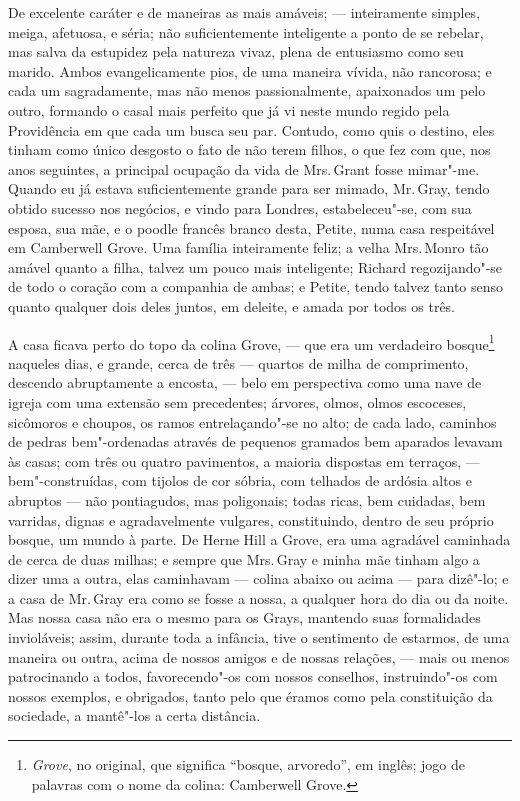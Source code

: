 De excelente caráter e de maneiras as mais amáveis; --- inteiramente
simples, meiga, afetuosa, e séria; não suficientemente inteligente a
ponto de se rebelar, mas salva da estupidez pela natureza vivaz, plena
de entusiasmo como seu marido. Ambos evangelicamente pios, de uma
maneira vívida, não rancorosa; e cada um sagradamente, mas não menos
passionalmente, apaixonados um pelo outro, formando o casal mais
perfeito que já vi neste mundo regido pela Providência em que cada um
busca seu par. Contudo, como quis o destino, eles tinham como único
desgosto o fato de não terem filhos, o que fez com que, nos anos
seguintes, a principal ocupação da vida de Mrs.\,Grant fosse
mimar"-me. Quando eu já estava suficientemente grande para ser
mimado, Mr.\,Gray, tendo obtido sucesso nos negócios, e vindo para
Londres, estabeleceu"-se, com sua esposa, sua mãe, e o poodle francês
branco desta, Petite, numa casa respeitável em Camberwell Grove. Uma
família inteiramente feliz; a velha Mrs.\,Monro tão amável quanto a filha,
talvez um pouco mais inteligente; Richard regozijando"-se de todo o
coração com a companhia de ambas; e Petite, tendo talvez tanto senso
quanto qualquer dois deles juntos, em deleite, e amada por todos os
três.

A casa ficava perto do topo da colina Grove, --- que era um
verdadeiro bosque\footnote{\textit{Grove}, no original, que significa
  ``bosque, arvoredo'', em inglês; jogo de palavras com o nome da
  colina: Camberwell Grove.} naqueles dias, e grande,
cerca de três --- quartos de milha de comprimento, descendo abruptamente
a encosta, --- belo em perspectiva como uma nave de igreja com uma
extensão sem precedentes; árvores, olmos, olmos escoceses, sicômoros e
choupos, os ramos entrelaçando"-se no alto; de cada lado, caminhos de
pedras bem"-ordenadas através de pequenos gramados bem aparados levavam
às casas; com três ou quatro pavimentos, a maioria dispostas em
terraços, --- bem"-construídas, com tijolos de cor sóbria, com telhados de
ardósia altos e abruptos --- não pontiagudos, mas poligonais; todas
ricas, bem cuidadas, bem varridas, dignas e agradavelmente vulgares,
constituindo, dentro de seu próprio bosque, um mundo à parte. De Herne
Hill a Grove, era uma agradável caminhada de cerca de duas milhas; e
sempre que Mrs.\,Gray e minha mãe tinham algo a dizer uma a outra, elas
caminhavam --- colina abaixo ou acima --- para dizê"-lo; e a casa de Mr.\,Gray era como se fosse a nossa, a qualquer hora do dia ou da noite. Mas
nossa casa não era o mesmo para os Grays, mantendo suas formalidades
invioláveis; assim, durante toda a infância, tive o sentimento de
estarmos, de uma maneira ou outra, acima de nossos amigos e de nossas
relações, --- mais ou menos patrocinando a todos, favorecendo"-os com
nossos conselhos, instruindo"-os com nossos exemplos, e obrigados, tanto
pelo que éramos como pela constituição da sociedade, a mantê"-los a certa
distância.

